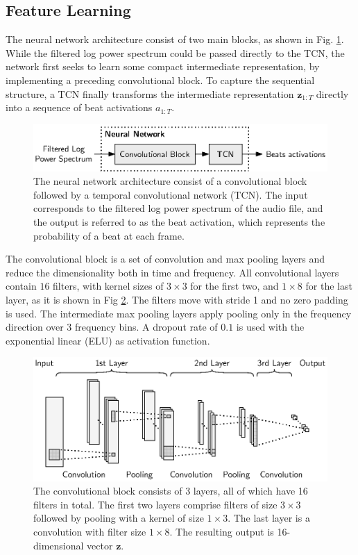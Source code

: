 \documentclass{scrartcl}
\begin{document}
\subsection{Feature Learning}
The neural network architecture consist of two main blocks, as shown in Fig. \ref{fig:neural_net}. While the filtered log power spectrum could be passed directly to the TCN, the network first seeks to learn some compact intermediate representation, by implementing a preceding convolutional block. To capture the sequential structure, a TCN finally transforms the intermediate representation $\mathbf z_{1:T}$ directly into a sequence of beat activations $a_{1:T}$.
\begin{figure}[htbp]
\centering
\includegraphics[scale=1.0]{figures/neural_net.eps}
\caption{The neural network architecture consist of a convolutional block followed by a temporal convolutional network (TCN). The input corresponds to the filtered log power spectrum of the audio file, and the output is referred to as the beat activation, which represents the probability of a beat at each frame.}
\label{fig:neural_net}
\end{figure}    

The convolutional block is a set of convolution and max pooling layers and reduce the dimensionality both in time and frequency. All convolutional layers contain $16$ filters, with kernel sizes of $3\times3$ for the first two, and $1\times8$ for the last layer, as it is shown in Fig \ref{fig:conv_block}. The filters move with stride 1 and no zero padding is used. The intermediate max pooling layers apply pooling only in the frequency direction over $3$ frequency bins. A dropout \cite{Tompson2015} rate of $0.1$ is used with the exponential linear (ELU) \cite{Clevert2015} as activation function.
\begin{figure}[htbp]
\centering
\includegraphics[scale=1.0]{figures/conv_block.eps}
\caption{The convolutional block consists of 3 layers, all of which have 16 filters in total. The first two layers comprise filters of size $3\times3$ followed by pooling with a kernel of size $1\times3$. The last layer is a convolution with filter size $1\times8$. The resulting output is 16-dimensional vector $\mathbf z$.}
\label{fig:conv_block}
\end{figure}    
\end{document}
